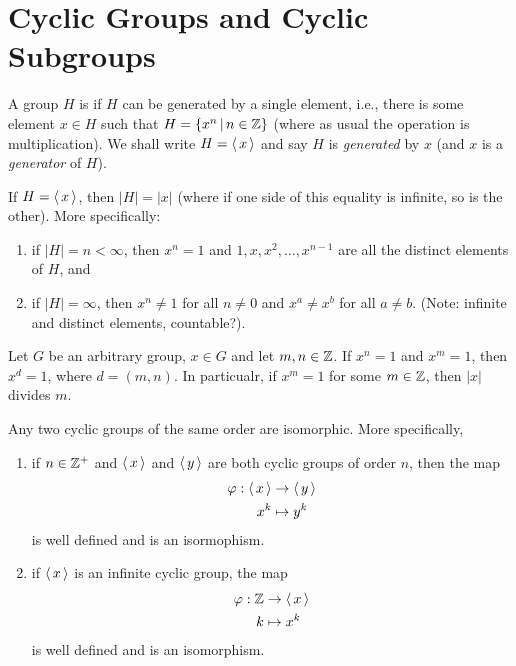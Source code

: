 \documentclass[10pt,a4paper]{report}
\begin{document}
\section{Cyclic Groups and Cyclic Subgroups}

\begin{definition} A group $H$ is  if $H$ can be generated by a single element, i.e., there is some element $x \in H$ such that $H = \{x^n\,|\,n \in \mathbb{Z}\}$  (where as usual the operation is multiplication).  We shall write $H = \left \langle\, x \,\right \rangle$ and say $H$ is \textit{generated} by $x$ (and $x$ is a \textit{generator} of $H$).
\end{definition}

\begin{prop}If $H = \left \langle\, x \,\right \rangle$, then $|H|=|x|$ (where if one side of this equality is infinite, so is the other).  More specifically:
\begin{enumerate}
	\item if $|H| = n < \infty$, then $x^n=1$ and $1,x,x^2,\dots, x^{n-1}$ are all the distinct elements of $H$, and 
	\item if $|H|=\infty$, then $x^n\ne 1$ for all $n\ne0$ and $x^a\ne x^b$ for all $a \ne b$. (Note: infinite and distinct elements, countable?).
\end{enumerate}
\end{prop}

\begin{prop}Let $G$ be an arbitrary group, $x \in G$ and let $m,n\in \mathbb{Z}$.  If $x^n=1$ and $x^m=1$, then $x^d=1$, where $d=(m,n)$.  In particualr, if $x^m=1$ for some $m \in \mathbb{Z}$, then $|x|$ divides $m$.
\end{prop}

\begin{theorem}Any two cyclic groups of the same order are isomorphic.  More specifically, 
\begin{enumerate}
	\item if $n\in \mathbb{Z}^+$ and $\left \langle\, x \,\right \rangle$ and $\left \langle\, y \,\right \rangle$ are both cyclic groups of order $n$, then the map
	\begin{align*}
		\varphi: \left \langle\, x \,\right \rangle &\to \left \langle\, y \,\right \rangle\\
		x^k &\mapsto y^k
	\end{align*}is well defined and is an isormophism.
	
	\item if $\left \langle\, x \,\right \rangle$ is an infinite cyclic group, the map 
	\begin{align*}
		\varphi: \mathbb{Z} &\to \left \langle\, x \,\right \rangle \\
		k &\mapsto x^k
	\end{align*}is well defined and is an isomorphism.
\end{enumerate}
\end{theorem}
\end{document}
